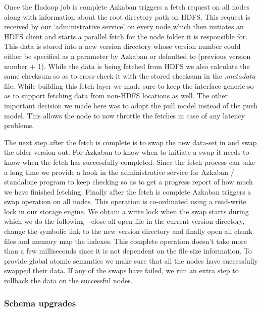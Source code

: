 \documentclass[10pt,twocolumn,preprint,natbib,authoryear]{sigplanconf}
\begin{document}
Once the Hadoop job is complete Azkaban triggers a fetch request on all \projectname{} nodes along with information about the root directory path on HDFS. This request is received by our `administrative service' on every node which then initiates an HDFS client and starts a parallel fetch for the node folder it is responsible for. This data is stored into a new version directory whose version number could either be specified as a parameter by Azkaban or defaulted to (previous version number + 1). While the data is being fetched from HDFS we also calculate the same checksum so as to cross-check it with the stored checksum in the $.metadata$ file. While building this fetch layer we made sure to keep the interface generic so as to support fetching data from non-HDFS locations as well. The other important decision we made here was to adopt the pull model instead of the push model. This allows the \projectname{} node to now throttle the fetches in case of any latency problems. 

The next step after the fetch is complete is to swap the new data-set in and swap the older version out. For Azkaban to know when to initiate a swap it needs to know when the fetch has successfully completed. Since the fetch process can take a long time we provide a hook in the administrative service for Azkaban / standalone program to keep checking so as to get a progress report of how much we have finished fetching. Finally after the fetch is complete Azkaban triggers a swap operation on all nodes. This operation is co-ordinated using a read-write lock in our storage engine. We obtain a write lock when the swap starts during which we do the following - close all open file in the current version directory, change the symbolic link to the new version directory and finally open all chunk files and memory map the indexes. This complete operation doesn't take more than a few milliseconds since it is not dependent on the file size information. To provide global atomic semantics we make sure that all the nodes have successfully swapped their data. If any of the swaps have failed, we run an extra step to rollback the data on the successful nodes.



\subsubsection{Schema upgrades}
\label{sec:read_only:data_cycle:schema_upgrades}
\end{document}
